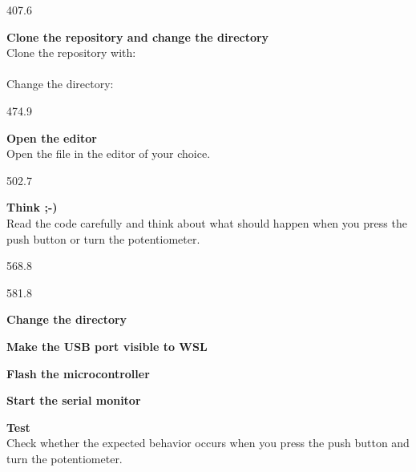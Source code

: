 \documentclass{aslab}
\begin{document}
\begin{region}[pitch=13.35]{407.6}
\begin{letters}
\item \textbf{Clone the repository and change the directory}\\
  Clone the repository with:\\
  \\
  Change the directory:\\
\end{letters}
\end{region}

\begin{region}[pitch=13.6]{474.9}
\begin{letters}[start=2]
\item \textbf{Open the editor}\\
  Open the file  in the editor of your choice.
\end{letters}
\end{region}

\begin{region}[pitch=13.35]{502.7}
\begin{letters}[start=3]
\item \textbf{Think ;-)}\\
  Read the code carefully and think about what should happen when you
  press the push button or turn the potentiometer.
\end{letters}
\end{region}

\begin{region}{568.8}
\end{region}

\begin{region}[pitch=12.5]{581.8}
\begin{letters}
\item \textbf{Change the directory}\\
\item \textbf{Make the USB port visible to WSL}\\
\item \textbf{Flash the microcontroller}\\
\item \textbf{Start the serial monitor}\\
\item \textbf{Test}\\
  Check whether the expected behavior occurs when you press the push button
  and turn the potentiometer.
\end{letters}
\end{region}
\end{document}

